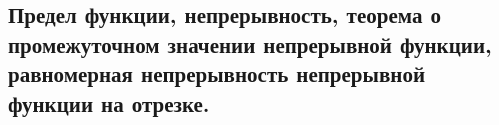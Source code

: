 \subsection{ Предел функции, непрерывность, теорема о промежуточном значении непрерывной функции, равномерная непрерывность непрерывной функции на отрезке.}